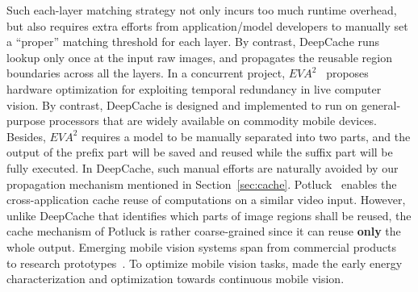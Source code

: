 \documentclass[10pt,acmtog]{acmart}
\newcommand{\framework}{DeepCache\xspace}
\newcommand{\sys}{\framework{}}
\newcommand{\revise}[1]{{#1}}
\begin{document}
\revise{Such each-layer matching strategy not only incurs too much runtime overhead, but also requires extra efforts from application/model developers to manually set a ``proper'' matching threshold for each layer.
By contrast, \sys{} runs lookup only once at the input raw images, and propagates the reusable region boundaries across all the layers.
In a concurrent project, $EVA^2$~\cite{buckler2018eva} proposes hardware optimization for exploiting temporal redundancy in live computer vision. By contrast, \sys{} is designed and implemented to run on general-purpose processors that are widely available on commodity mobile devices.
Besides, $EVA^2$ requires a model to be manually separated into two parts, and the output of the prefix part will be saved and reused while the suffix part will be fully executed. In \sys{}, such manual efforts are naturally avoided by our propagation mechanism mentioned in Section~\ref{sec:cache}.
Potluck~\cite{guo2018potluck} enables the cross-application cache reuse of computations on a similar video input.
However, unlike \sys{} that identifies which parts of image regions shall be reused, the cache mechanism of Potluck is rather coarse-grained since it can reuse \textbf{only} the whole output.
}%
Emerging mobile vision systems span from commercial products~\cite{GoogleTranslate,amazon} to research prototypes~\cite{conf/ica3pp/OuLSE17,conf/mobisys/ZhuYZZ17,conf/cvpr/DasDWWSS17,conf/huc/HodgesWBISBSKW06,conf/mobisys/ZengCZ17,conf/mobisys/JainMC15,hwang2017raven}.
To optimize mobile vision tasks,
\cite{conf/mobisys/LiKamWaPPZB13,likamwa2013energy} made the early energy characterization and optimization towards continuous mobile vision.
\end{document}
